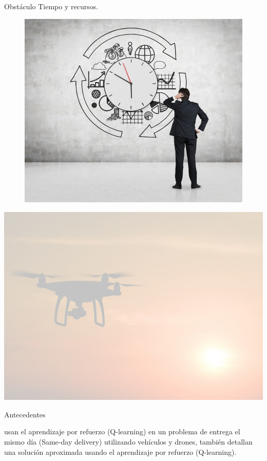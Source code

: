 \documentclass{beamer}
\begin{document}
\begin{frame}{Obstáculo}
    Tiempo y recursos.
        \begin{figure}[h!t]
        \centering
        \includegraphics[scale = 0.25 ]{imagen4.jpg}
        \end{figure}
\end{frame}

{
{
    \includegraphics[width=\paperwidth,height=\paperheight]{imagen7.jpeg}
}
\begin{frame}{Antecedentes}

    {\centering \color{black} \citet{CHEN2022939} usan el aprendizaje por refuerzo (Q-learning) en un problema de entrega el mismo día (Same-day delivery) utilizando vehículos y drones, también detallan una solución aproximada usando el aprendizaje por refuerzo (Q-learning). }

\end{frame}
}
\end{document}

